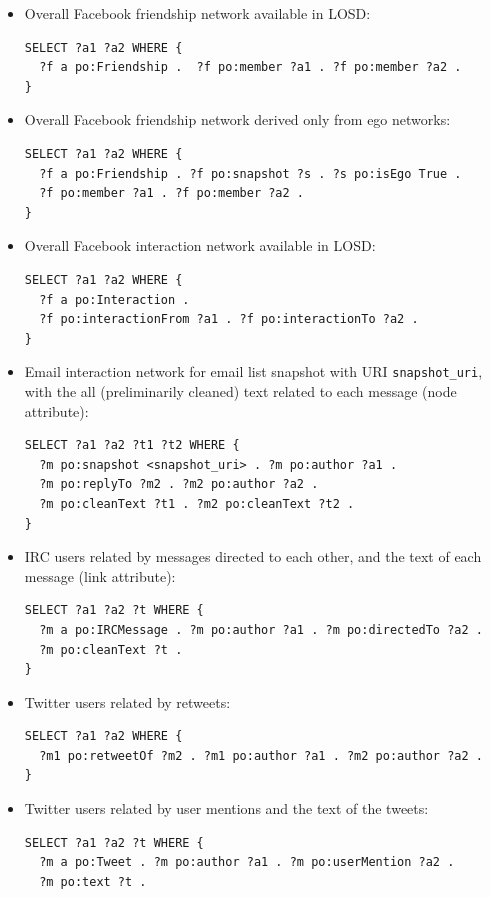 \documentclass[data,datadescriptor,submit,moreauthors,pdftex]{Definitions/mdpi}
\begin{document}
\begin{itemize}
  \item Overall Facebook friendship network available in LOSD:
\begin{lstlisting}[language=spq]
SELECT ?a1 ?a2 WHERE { 
  ?f a po:Friendship .  ?f po:member ?a1 . ?f po:member ?a2 .
}
\end{lstlisting}
  \item Overall Facebook friendship network derived only from ego networks:
\begin{lstlisting}[language=spq]
SELECT ?a1 ?a2 WHERE { 
  ?f a po:Friendship . ?f po:snapshot ?s . ?s po:isEgo True .
  ?f po:member ?a1 . ?f po:member ?a2 .
}
\end{lstlisting}
  \item Overall Facebook interaction network available in LOSD:
\begin{lstlisting}[language=spq]
SELECT ?a1 ?a2 WHERE { 
  ?f a po:Interaction .
  ?f po:interactionFrom ?a1 . ?f po:interactionTo ?a2 .
}
\end{lstlisting}
  \item Email interaction network for email list snapshot with URI \verb|snapshot_uri|,
    with the all (preliminarily cleaned) text related to each message (node attribute):
\begin{lstlisting}[language=spq]
SELECT ?a1 ?a2 ?t1 ?t2 WHERE { 
  ?m po:snapshot <snapshot_uri> . ?m po:author ?a1 .
  ?m po:replyTo ?m2 . ?m2 po:author ?a2 .
  ?m po:cleanText ?t1 . ?m2 po:cleanText ?t2 .
}
\end{lstlisting}
  \item IRC users related by messages directed to each other, and the text of each message (link attribute):
\begin{lstlisting}[language=spq]
SELECT ?a1 ?a2 ?t WHERE { 
  ?m a po:IRCMessage . ?m po:author ?a1 . ?m po:directedTo ?a2 .
  ?m po:cleanText ?t .
}
\end{lstlisting}
  \item Twitter users related by retweets:
\begin{lstlisting}[language=spq]
SELECT ?a1 ?a2 WHERE { 
  ?m1 po:retweetOf ?m2 . ?m1 po:author ?a1 . ?m2 po:author ?a2 .
}
\end{lstlisting}
  \item Twitter users related by user mentions and the text of the tweets:
\begin{lstlisting}[language=spq]
SELECT ?a1 ?a2 ?t WHERE { 
  ?m a po:Tweet . ?m po:author ?a1 . ?m po:userMention ?a2 .
  ?m po:text ?t .

\end{lstlisting}
\end{itemize}
\end{document}
